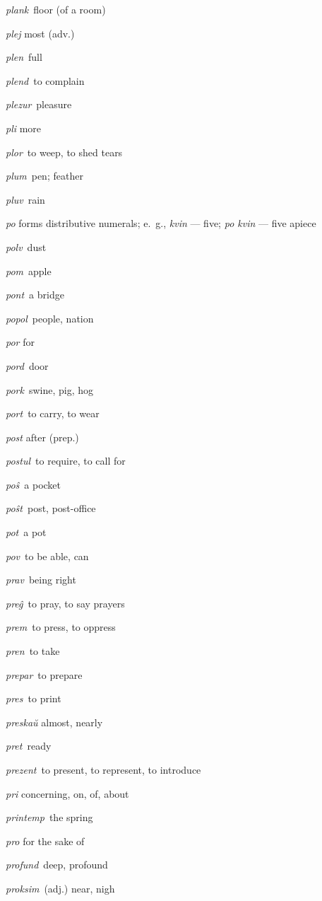 \begin{landscape}
\begin{multicols}{5}
\begin{outdent}{1em}
\emph{plank\,} floor (of a room)

\emph{plej} most (adv.)

\emph{plen\,} full

\emph{plend\,} to complain

\emph{plezur\,} pleasure

\emph{pli} more

\emph{plor\,} to weep, to shed tears

\emph{plum\,} pen; feather

\emph{pluv\,} rain

\emph{po} forms distributive numerals; e.~g., \emph{kvin} — five; \emph{po kvin} — five apiece

\emph{polv\,} dust

\emph{pom\,} apple

\emph{pont\,} a bridge

\emph{popol\,} people, nation

\emph{por} for

\emph{pord\,} door

\emph{pork\,} swine, pig, hog

\emph{port\,} to carry, to wear

\emph{post} after (prep.)

\emph{postul\,} to require, to call for

\emph{poŝ\,} a pocket

\emph{poŝt\,} post, post-office

\emph{pot\,} a pot

\emph{pov\,} to be able, can

\emph{prav\,} being right

\emph{preĝ\,} to pray, to say prayers

\emph{prem\,} to press, to oppress

\emph{pren\,} to take

\emph{prepar\,} to prepare

\emph{pres\,} to print

\emph{preskaŭ} almost, nearly

\emph{pret\,} ready

\emph{prezent\,} to present, to represent, to introduce

\emph{pri} concerning, on, of, about

\emph{printemp\,} the spring

\emph{pro} for the sake of 

\emph{profund\,} deep, profound

\emph{proksim\,} (adj.) near, nigh


\end{outdent}
\end{multicols}
\end{landscape}
